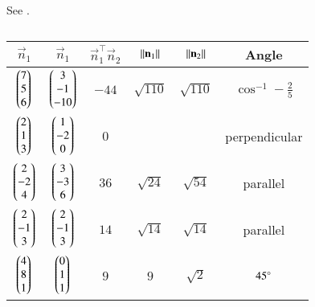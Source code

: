     See .
\begin{table}[htbp]
    \centering
    \caption{}
    \label{tab:12/11/3/13}
    \begin{tabular}{|c|c|c|c|c|c|}
        \hline
        $\vec{n}_1$ & $\vec{n}_1$ & $\vec{n}_1^{\top}\vec{n}_2$ & $\lVert\mathbf{n}_1\rVert$ & $\lVert\mathbf{n}_2\rVert$ & Angle\\
        \hline
        $\begin{pmatrix}7\\5\\6\end{pmatrix}$ & $\begin{pmatrix}3\\-1\\-10\end{pmatrix}$ & $-44$ & $\sqrt{110}$ & $\sqrt{110}$ & $\cos^{-1}-\frac{2}{5}$ \\
        \hline
        $\begin{pmatrix}2\\1\\3\end{pmatrix}$ & $\begin{pmatrix}1\\-2\\0\end{pmatrix}$ & $0$ & & & perpendicular \\
        \hline
        $\begin{pmatrix}2\\-2\\4\end{pmatrix}$ & $\begin{pmatrix}3\\-3\\6\end{pmatrix}$ & $36$ & $\sqrt{24}$ & $\sqrt{54}$ & parallel \\
        \hline
        $\begin{pmatrix}2\\-1\\3\end{pmatrix}$ & $\begin{pmatrix}2\\-1\\3\end{pmatrix}$ & $14$ & $\sqrt{14}$ & $\sqrt{14}$ & parallel \\
        \hline
        $\begin{pmatrix}4\\8\\1\end{pmatrix}$ & $\begin{pmatrix}0\\1\\1\end{pmatrix}$ & $9$ & $9$ & $\sqrt{2}$ & $45\degree$ \\
        \hline
    \end{tabular}
\end{table}

